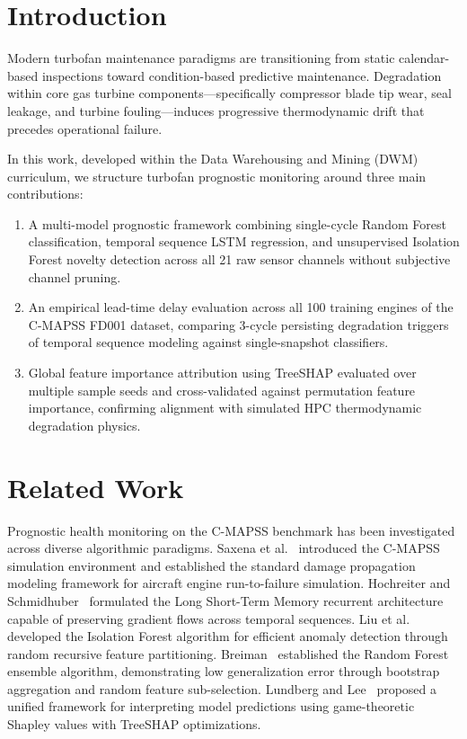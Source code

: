 \documentclass[conference]{IEEEtran}
\begin{document}
\section{Introduction}
Modern turbofan maintenance paradigms are transitioning from static calendar-based inspections toward condition-based predictive maintenance. Degradation within core gas turbine components—specifically compressor blade tip wear, seal leakage, and turbine fouling—induces progressive thermodynamic drift that precedes operational failure. 

In this work, developed within the Data Warehousing and Mining (DWM) curriculum, we structure turbofan prognostic monitoring around three main contributions:
\begin{enumerate}
    \item A multi-model prognostic framework combining single-cycle Random Forest classification, temporal sequence LSTM regression, and unsupervised Isolation Forest novelty detection across all 21 raw sensor channels without subjective channel pruning.
    \item An empirical lead-time delay evaluation across all 100 training engines of the C-MAPSS FD001 dataset, comparing 3-cycle persisting degradation triggers of temporal sequence modeling against single-snapshot classifiers.
    \item Global feature importance attribution using TreeSHAP evaluated over multiple sample seeds and cross-validated against permutation feature importance, confirming alignment with simulated HPC thermodynamic degradation physics.
\end{enumerate}

\section{Related Work}
Prognostic health monitoring on the C-MAPSS benchmark has been investigated across diverse algorithmic paradigms.
Saxena et al.~\cite{saxena2008damage} introduced the C-MAPSS simulation environment and established the standard damage propagation modeling framework for aircraft engine run-to-failure simulation.
Hochreiter and Schmidhuber~\cite{hochreiter1997lstm} formulated the Long Short-Term Memory recurrent architecture capable of preserving gradient flows across temporal sequences.
Liu et al.~\cite{liu2008isolation} developed the Isolation Forest algorithm for efficient anomaly detection through random recursive feature partitioning.
Breiman~\cite{breiman2001random} established the Random Forest ensemble algorithm, demonstrating low generalization error through bootstrap aggregation and random feature sub-selection.
Lundberg and Lee~\cite{lundberg2017unified} proposed a unified framework for interpreting model predictions using game-theoretic Shapley values with TreeSHAP optimizations.
\end{document}
